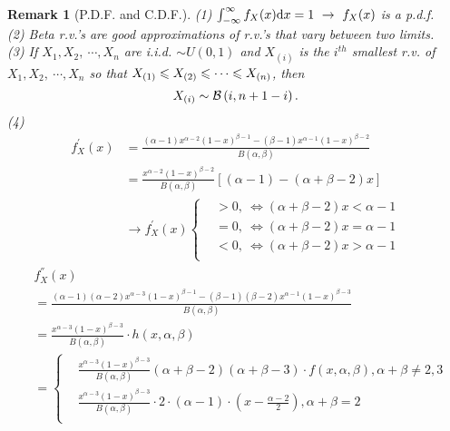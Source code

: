 \documentclass[openany,12pt]{book}
\newtheorem{remark}{Remark}[chapter]
\begin{document}
\begin{remark}[P.D.F. and C.D.F.]
(1) $\int_{-\infty}^{\infty}{f_X(x)\dif x}=1\ \to\ f_X(x)$ is a p.d.f.
\vspace{0.4cm}\\
(2) Beta r.v.'s are good approximations of r.v.'s that vary between two limits.\vspace{0.2cm}\\
(3) If $X_1,X_2,\ \cdots,X_n$ are i.i.d. $\sim U(0,1)$ and ${X}_{(i)}$ is the $i^{th}$ smallest r.v. of $X_1,X_2,\ \cdots,X_n$ so that $X_{(1)}\ls{X}_{(2)}\ls\cdots\ls X_{(n)}$, then
$$
{X}_{(i)}\sim\mb\left(i,n+1-i\right).
$$
(4)
$$\begin{aligned}
f_{X}^{'}(x) &= \frac{\left( \alpha - 1 \right)x^{\alpha - 2}\left( 1 - x \right)^{\beta - 1} - (\beta - 1)x^{\alpha - 1}{(1 - x)}^{\beta - 2}}{B(\alpha,\beta)}\\
&= \frac{x^{\alpha - 2}{(1 - x)}^{\beta - 2}}{B(\alpha,\beta)}\left[ \left( \alpha - 1 \right) - \left( \alpha + \beta - 2 \right)x \right]\\
&\to f_{X}^{'}(x)\left\{ \begin{aligned}
 &> 0,\ \Leftrightarrow \left( \alpha + \beta - 2 \right)x < \alpha - 1 \\
 &= 0,\ \Leftrightarrow \left( \alpha + \beta - 2 \right)x = \alpha - 1 \\
 &< 0,\ \Leftrightarrow \left( \alpha + \beta - 2 \right)x > \alpha - 1 \\
\end{aligned} \right.
\end{aligned}$$
$$\begin{aligned}
&f_{X}^{''}(x)\\
&= \frac{\left( \alpha - 1 \right)\left( \alpha - 2 \right)x^{\alpha - 3}\left( 1 - x \right)^{\beta - 1} - (\beta - 1)(\beta - 2)x^{\alpha - 1}{(1 - x)}^{\beta - 3}}{B(\alpha,\beta)}\\
&= \frac{x^{\alpha - 3}{(1 - x)}^{\beta - 3}}{B(\alpha,\beta)}\cdot h(x,\alpha,\beta)\\
&= \left\{ \begin{aligned}
&\frac{x^{\alpha - 3}\left( 1 - x \right)^{\beta - 3}}{B(\alpha,\beta)}\left( \alpha + \beta - 2 \right)\left( \alpha + \beta - 3 \right)\cdot f(x,\alpha,\beta),\alpha + \beta \neq 2,3 \\
&\frac{x^{\alpha - 3}\left( 1 - x \right)^{\beta - 3}}{B(\alpha,\beta)} \cdot 2 \cdot \left( \alpha - 1 \right) \cdot \left( x - \frac{\alpha - 2}{2} \right),\alpha + \beta = 2\\

\end{aligned}
\end{aligned}$$
\end{remark}
\end{document}
